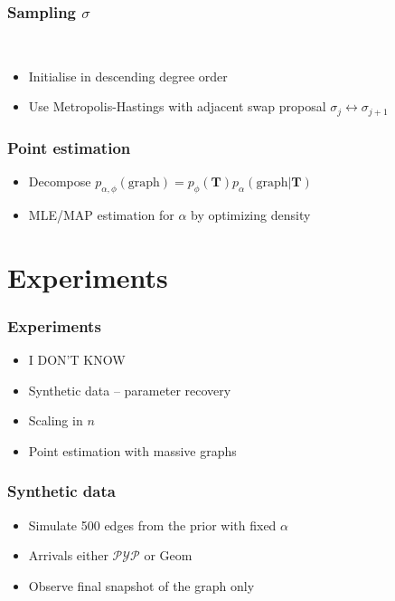 \documentclass[final,hyperref={pdfpagelabels=false},noamsthm]{beamer}
\def\Geom{\text{Geom}}
\newcommand{\PYP}{\mathcal{PYP}}
\newcommand{\bfT}{\mathbf{T}}
\begin{document}
\begin{frame}
	\frametitle{Sampling $\sigma$}\

	\begin{itemize} 
	\item Initialise in descending degree order
	\item Use Metropolis-Hastings with adjacent swap proposal $\sigma_j \leftrightarrow \sigma_{j+1}$
	\end{itemize}
\end{frame}

\begin{frame}
	\frametitle{Point estimation}
	\begin{itemize}
		\item Decompose $p_{\alpha,\phi}(\text{graph}) = p_\phi(\bfT)p_\alpha(\text{graph}|\bfT)$
		\item MLE/MAP estimation for $\alpha$ by optimizing density
	\end{itemize}
\end{frame}

\section{Experiments}
\begin{frame}
	\frametitle{Experiments}
	\begin{itemize}
		\item I DON'T KNOW
		\item Synthetic data -- parameter recovery
		\item Scaling in $n$
		\item Point estimation with massive graphs
	\end{itemize}
\end{frame}

\begin{frame}
	\frametitle{Synthetic data}
	\begin{itemize}
		\item Simulate 500 edges from the prior with fixed $\alpha$ 
		\item Arrivals either $\PYP$ or $\Geom$
		\item Observe final snapshot of the graph only
	\end{itemize}
\end{frame}
\end{document}
